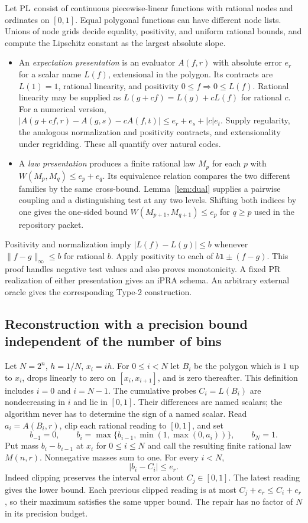 Let $\mathrm{PL}$ consist of continuous piecewise-linear functions with rational nodes
and ordinates on $[0,1]$. Equal polygonal functions can have different node lists.
Unions of node grids decide equality, positivity, and uniform rational bounds,
and compute the Lipschitz constant as the largest absolute slope.
\begin{itemize}
\item An \emph{expectation presentation} is an evaluator $A(f,r)$ with absolute
error $e_r$ for a scalar name $L(f)$, extensional in the polygon. Its contracts
are $L(1)=1$, rational linearity, and positivity $0\le f\Rightarrow 0\le L(f)$.
Rational linearity may be supplied as
$L(g+cf)=L(g)+cL(f)$ for rational $c$. For a numerical version,
$|A(g+cf,r)-A(g,s)-cA(f,t)|\le e_r+e_s+|c|e_t$.
Supply regularity, the analogous normalization and positivity contracts, and
extensionality under regridding. These all quantify over natural codes.
\item A \emph{law presentation} produces a finite rational law $M_p$ for each
$p$ with $W(M_p,M_q)\le e_p+e_q$. Its equivalence relation compares the two
different families by the same cross-bound. Lemma~\ref{lem:dual} supplies a
pairwise coupling and a distinguishing test at any two levels. Shifting both
indices by one gives the one-sided bound $W(M_{p+1},M_{q+1})\le e_p$ for
$q\ge p$ used in the repository packet.
\end{itemize}
Positivity and normalization imply $|L(f)-L(g)|\le b$ whenever
$\|f-g\|_\infty\le b$ for rational $b$. Apply positivity to each of
$b\mathbf 1\pm(f-g)$. This proof handles negative test values and also proves
monotonicity. A fixed PR realization of either presentation gives an iPRA
schema. An arbitrary external oracle gives the corresponding Type-2
construction.

\subsection{Reconstruction with a precision bound independent of the number of bins}

Let $N=2^n$, $h=1/N$, $x_i=ih$. For $0\le i<N$ let $B_i$ be the
polygon which is $1$ up to $x_i$, drops linearly to zero on
$[x_i,x_{i+1}]$, and is zero thereafter. This definition includes $i=0$
and $i=N-1$. The cumulative probes $C_i=L(B_i)$ are nondecreasing in $i$
and lie in $[0,1]$. Their differences are named scalars; the algorithm
never has to determine the sign of a named scalar. Read $a_i=A(B_i,r)$,
clip each rational reading to $[0,1]$, and set
\[
 b_{-1}=0,\qquad b_i=\max\{b_{i-1},\min(1,\max(0,a_i))\},\qquad b_N=1.
\]
Put mass $b_i-b_{i-1}$ at $x_i$ for $0\le i\le N$ and call the resulting
finite rational law $M(n,r)$. Nonnegative masses sum to one. For every
$i<N$,
\begin{equation}
                         |b_i-C_i|\le e_r.                 \label{eq:repair}
\end{equation}
Indeed clipping preserves the interval error about $C_j\in[0,1]$. The latest
reading gives the lower bound. Each previous clipped reading is at most
$C_j+e_r\le C_i+e_r$, so their maximum satisfies the same upper bound. The
repair has no factor of $N$ in its precision budget.

